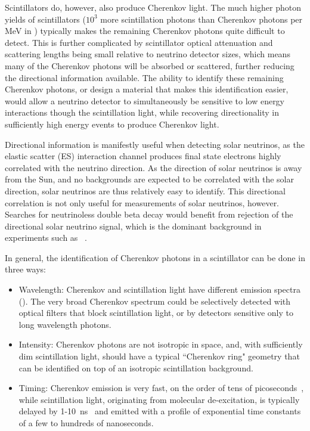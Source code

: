 Scintillators do, however, also produce Cherenkov light. 
The much higher photon yields of scintillators ($10^3$ more scintillation photons than Cherenkov photons per MeV in {\labppo}) typically makes the remaining Cherenkov photons quite difficult to detect.
This is further complicated by scintillator optical attenuation and scattering lengths being small relative to neutrino detector sizes, which means many of the Cherenkov photons will be absorbed or scattered, further reducing the directional information available.
The ability to identify these remaining Cherenkov photons, or design a material that makes this identification easier, would allow a neutrino detector to simultaneously be sensitive to low energy interactions though the scintillation light, while recovering directionality in sufficiently high energy events to produce Cherenkov light.

Directional information is manifestly useful when detecting solar neutrinos, as the elastic scatter (ES) interaction channel produces final state electrons highly correlated with the neutrino direction. 
As the direction of solar neutrinos is away from the Sun, and no backgrounds are expected to be correlated with the solar direction, solar neutrinos are thus relatively easy to identify. 
This directional correlation is not only useful for measurements of solar neutrinos, however. Searches for neutrinoless double beta decay would benefit from rejection of the directional solar neutrino signal, which is the dominant background in experiments such as {\snop}~\cite{snop}.

In general, the identification of Cherenkov photons in a scintillator can be done in three ways:
\begin{itemize}
    \item Wavelength:  Cherenkov and scintillation light have different emission spectra (). The very broad Cherenkov spectrum could be selectively detected with optical filters that block scintillation light, or by detectors sensitive only to long wavelength photons.
	\item Intensity: Cherenkov photons are not isotropic in space, and, with sufficiently dim scintillation light, should have a typical ``Cherenkov ring" geometry that can be identified on top of an isotropic scintillation background.
	\item Timing: Cherenkov emission is very fast, on the order of tens of picoseconds~\cite{cherenkov}, while scintillation light, originating from molecular de-excitation, is typically delayed by 1-10~ns~\cite{birks} and emitted with a profile of exponential time constants of a few to hundreds of nanoseconds.
\end{itemize}

